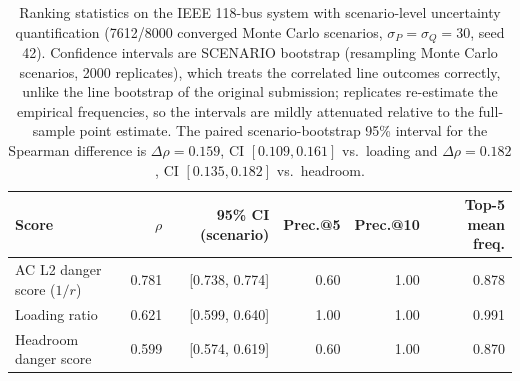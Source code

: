 \begin{table}[t]
\centering
\caption{Ranking statistics on the IEEE 118-bus system with scenario-level
uncertainty quantification (7612/8000 converged Monte Carlo scenarios,
$\sigma_P=\sigma_Q=30$, seed 42).  Confidence intervals are SCENARIO
bootstrap (resampling Monte Carlo scenarios, 2000 replicates), which
treats the correlated line outcomes correctly, unlike the line bootstrap of
the original submission; replicates re-estimate the empirical frequencies, so
the intervals are mildly attenuated relative to the full-sample point
estimate.  The paired scenario-bootstrap 95\% interval for the
Spearman difference is $\Delta\rho = 0.159$, CI $[0.109, 0.161]$ vs.\ loading and $\Delta\rho = 0.182$, CI $[0.135, 0.182]$ vs.\ headroom.
\label{tab:ranking}}
\footnotesize
\begin{tabularx}{\textwidth}{@{}Xrrrrr@{}}
\toprule
Score & $\rho$ & 95\% CI (scenario) & Prec.@5 & Prec.@10 & Top-5 mean freq. \\
\midrule
AC L2 danger score ($1/r$) & 0.781 & [0.738, 0.774] & 0.60 & 1.00 & 0.878 \\
Loading ratio & 0.621 & [0.599, 0.640] & 1.00 & 1.00 & 0.991 \\
Headroom danger score & 0.599 & [0.574, 0.619] & 0.60 & 1.00 & 0.870 \\
\bottomrule
\end{tabularx}
\end{table}
